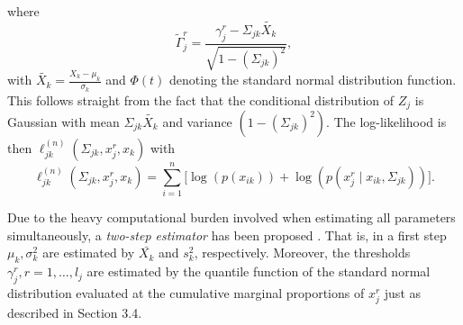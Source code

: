 where
\begin{equation*}
    \tilde{\Gamma}_j^{r} = \frac{\gamma_j^{r} - \Sigma_{jk}\tilde{X_k} }{\sqrt{1-(\Sigma_{jk})^2}},
\end{equation*}
with $\tilde{X_k} = \frac{X_k-\mu_k}{\sigma_k}$ and $\Phi(t)$ denoting the standard normal distribution function. This follows straight from the fact that the conditional distribution of $Z_j$ is Gaussian with mean $\Sigma_{jk}\tilde{X_k}$ and variance $(1-(\Sigma_{jk})^2)$. The log-likelihood is then $\ell_{jk}^{(n)}(\Sigma_{jk}, x_j^r,x_k)$ with
\begin{equation}\label{polyserial_loglikelihood}
    \ell_{jk}^{(n)}(\Sigma_{jk}, x_j^r,x_k) = \sum_{i=1}^n \big[\log(p(x_{ik})) + \log(p(x_{j}^{r} \mid x_{ik}, \Sigma_{jk}))\big].
\end{equation}

Due to the heavy computational burden involved when estimating all parameters simultaneously, a \textit{two-step estimator} has been proposed \citet{Olsson82}. That is, in a first step $\mu_k, \sigma_k^2$ are estimated by $\bar{X_k}$ and $s_k^2$, respectively. Moreover, the thresholds $\gamma_j^r, r = 1, \dots, l_{j}$ are estimated by the quantile function of the standard normal distribution evaluated at the cumulative marginal proportions of $x_j^r$ just as described in Section 3.4. %

